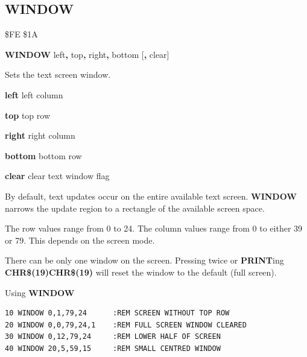 \subsection{WINDOW}
\begin{description}[leftmargin=2cm,style=nextline]
\item [Token:] \$FE \$1A
\item [Format:] {\bf WINDOW} left{\bf,} top{\bf,} right{\bf,} bottom
		[{\bf,} clear]
\item [Usage:] Sets the text screen window.

                 {\bf left} left column

                 {\bf top} top row

                 {\bf right} right column

                 {\bf bottom} bottom row

                 {\bf clear} clear text window flag

               By default, text updates occur on the entire available text
               screen. {\bf WINDOW} narrows the update region to a rectangle
               of the available screen space.

\item [Remarks:] The row values range from 0 to 24.
                 The column values range from 0 to either 39 or 79.
                 This depends on the screen mode.

                 There can be only one window on the screen.
                 Pressing  twice or {\bf PRINT}ing
                 {\bf CHR\$(19)CHR\$(19)} will reset the window
                 to the default (full screen).

\item [Example:] Using {\bf WINDOW}
\begin{tcolorbox}[colback=black,coltext=white]
\verbatimfont{\codefont}
\begin{verbatim}
10 WINDOW 0,1,79,24      :REM SCREEN WITHOUT TOP ROW
20 WINDOW 0,0,79,24,1    :REM FULL SCREEN WINDOW CLEARED
30 WINDOW 0,12,79,24     :REM LOWER HALF OF SCREEN
40 WINDOW 20,5,59,15     :REM SMALL CENTRED WINDOW
\end{verbatim}
\end{tcolorbox}
\end{description}


